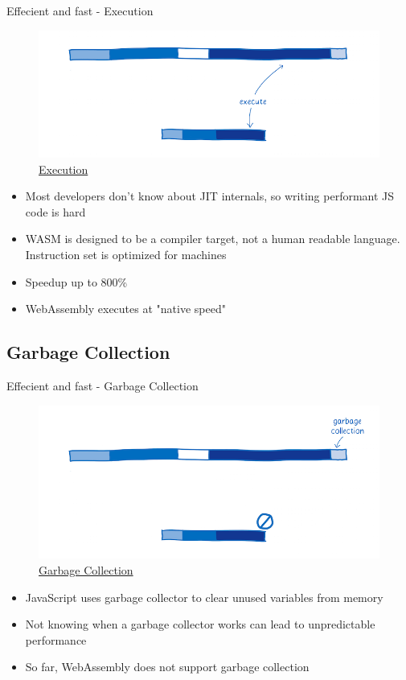 \documentclass{beamer}
\begin{document}
\begin{frame}{Effecient and fast - Execution}
    \begin{figure}
        \includegraphics[scale=0.2]{./images/execution.png}
        \caption{\href{https://www.smashingmagazine.com/2017/05/abridged-cartoon-introduction-webassembly/}{Execution}}
    \end{figure}
    \begin{itemize}
        \item Most developers don't know about JIT internals, so writing performant JS code is hard
        \item WASM is designed to be a compiler target, not a human readable language. Instruction set is optimized for machines
        \item Speedup up to 800\%
        \item WebAssembly executes at "native speed"
    \end{itemize}
\end{frame}

\subsection{Garbage Collection}

\begin{frame}{Effecient and fast - Garbage Collection}
    \begin{figure}
        \includegraphics[scale=0.2]{./images/garbage.png}
        \caption{\href{https://www.smashingmagazine.com/2017/05/abridged-cartoon-introduction-webassembly/}{Garbage Collection}}
    \end{figure}
    \begin{itemize}
        \item JavaScript uses garbage collector to clear unused variables from memory
        \item Not knowing when a garbage collector works can lead to unpredictable performance
        \item So far, WebAssembly does not support garbage collection
    \end{itemize}
\end{frame}
\end{document}
